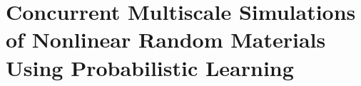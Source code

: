 \chapter{Concurrent Multiscale Simulations of Nonlinear Random Materials Using Probabilistic Learning}
\label{chap:fw2}
